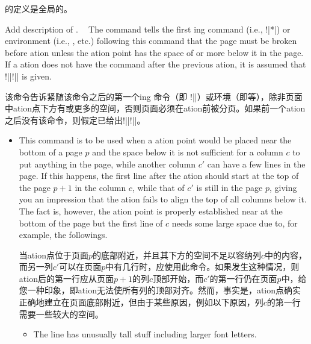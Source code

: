 \begin{description}
\begin{itemize}
 的定义是全局的。
\end{itemize}



\item[\Midx{\!\ensurevspace!}\marg{len}]\mbox{}\par
{}
{Add description of .}

The command tells the first \sync{}ing \cswitch{} command (i.e.,
\!\switchcolumn!|*|) or environment (i.e., , etc.\@)
following this command that the page must be broken before \sync{}ation
unless the \sync{}ation point has the space of  or more below it
in the page.  If a \sync{}ation does not have the command after the
previous \sync{}ation, it is assumed that
\!\ensurevspace!|{|\!\baselineskip!|}| is given.

该命令告诉紧随该命令之后的第一个\sync{}ing \cswitch{}命令（即 \!\switchcolumn!||）或环境（即等），除非页面中\sync{}ation点下方有或更多的空间，否则页面必须在\sync{}ation前被分页。如果前一个\sync{}ation之后没有该命令，则假定已给出\!\ensurevspace!|{|\!\baselineskip!|}|。

\begin{itemize}
\item
This command is to be used when a \sync{}ation point would be placed near
the bottom of a page $p$ and the space below it is not sufficient for a column
$c$ to put anything in the page, while another column $c'$ can have a few
lines in the page.  If this happens, the first line after the \sync{}ation
should start at the top of the page $p+1$ in the column $c$, while that of
$c'$ is still in the page $p$, giving you an impression that the
\sync{}ation fails to align the top of all columns below it.  The fact is,
however, the \sync{}ation point is properly established near at the bottom
of the page but the first line of $c$ needs some large space due to, for
example, the followings.

当\sync{}ation点位于页面$p$的底部附近，并且其下方的空间不足以容纳列$c$中的内容，而另一列$c'$可以在页面$p$中有几行时，应使用此命令。如果发生这种情况，则\sync{}ation后的第一行应从页面$p+1$的列$c$顶部开始，而$c'$的第一行仍在页面$p$中，给您一种印象，即\sync{}ation无法使所有列的顶部对齐。然而，事实是，\sync{}ation点确实正确地建立在页面底部附近，但由于某些原因，例如以下原因，列$c$的第一行需要一些较大的空间。

\begin{itemize}
\item
The line has unusually tall stuff including larger font letters.


\end{itemize}
\end{itemize}
\end{description}
